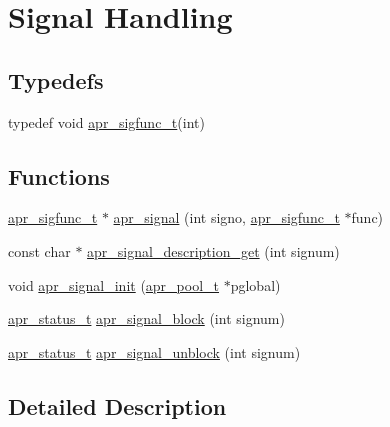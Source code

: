 \hypertarget{group__apr__signal}{}\section{Signal Handling}
\label{group__apr__signal}
\subsection*{Typedefs}
\begin{DoxyCompactItemize}
\item 
typedef void \hyperlink{group__apr__signal_ga2afd99d29d57dc1358aeccedb714368a}{apr\+\_\+sigfunc\+\_\+t}(int)
\end{DoxyCompactItemize}
\subsection*{Functions}
\begin{DoxyCompactItemize}
\item 
\hyperlink{group__apr__signal_ga2afd99d29d57dc1358aeccedb714368a}{apr\+\_\+sigfunc\+\_\+t} $\ast$ \hyperlink{group__apr__signal_ga77ecb509002eeb784c06014c635a9a5a}{apr\+\_\+signal} (int signo, \hyperlink{group__apr__signal_ga2afd99d29d57dc1358aeccedb714368a}{apr\+\_\+sigfunc\+\_\+t} $\ast$func)
\item 
const char $\ast$ \hyperlink{group__apr__signal_ga685b8a8e5e7a5067e3fe3456c5c1a150}{apr\+\_\+signal\+\_\+description\+\_\+get} (int signum)
\item 
void \hyperlink{group__apr__signal_ga76f1701a2f33697425b3fa6fa44a192b}{apr\+\_\+signal\+\_\+init} (\hyperlink{group__apr__pools_gaf137f28edcf9a086cd6bc36c20d7cdfb}{apr\+\_\+pool\+\_\+t} $\ast$pglobal)
\item 
\hyperlink{group__apr__errno_gaf76ee4543247e9fb3f3546203e590a6c}{apr\+\_\+status\+\_\+t} \hyperlink{group__apr__signal_ga111744ccf1db400150bf7c14c2cfc312}{apr\+\_\+signal\+\_\+block} (int signum)
\item 
\hyperlink{group__apr__errno_gaf76ee4543247e9fb3f3546203e590a6c}{apr\+\_\+status\+\_\+t} \hyperlink{group__apr__signal_ga9d8a1d786de4ace76f711806e9e34071}{apr\+\_\+signal\+\_\+unblock} (int signum)
\end{DoxyCompactItemize}


\subsection{Detailed Description}


